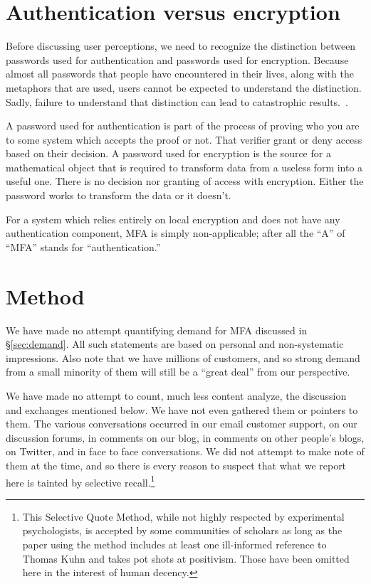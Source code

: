 \documentclass{soups}
\begin{document}
\section{Authentication versus encryption}

Before discussing user perceptions, we need to recognize the distinction between passwords used for authentication and passwords used for encryption.
Because almost all passwords that people have encountered in their lives,
along with the metaphors that are used, users cannot be expected to understand the distinction.
Sadly, failure to understand that distinction can lead to catastrophic results.~\autocite{Blaze2011:cablegate}.

A password used for authentication is part of the process of proving who you are to some system which accepts the proof or not. That verifier grant or deny access based on their decision. A password used for encryption is the source for a mathematical object that is required to transform data from a useless form into a useful one. There is no decision nor granting of access with encryption. Either the password works to transform the data or it doesn't.

For a system which relies entirely on local encryption and does not have any authentication component, MFA is simply non-applicable;
after all the “A” of “MFA” stands for “authentication.” 

\section{Method}

We have made no attempt quantifying demand for MFA discussed in \S\ref{sec:demand}.
All such statements are based on personal and non-systematic impressions.
Also note that we have millions of customers,
and so strong demand from a small minority of them will still be a “great deal” from our perspective.

We have made no attempt to count, much less content analyze, the discussion and exchanges mentioned below.
We have not even gathered them or pointers to them.
The various conversations occurred in our email customer support,
on our discussion forums,
in comments on our blog,
in comments on other people's blogs,
on Twitter,
and in face to face conversations. 
We did not attempt to make note of them at the time,
and so there is every reason to suspect that what we report here is tainted by selective recall.\footnote
  {This Selective Quote Method,
  while not highly respected by experimental psychologists,
  is accepted by some communities of scholars
  as long as the paper using the method includes
  at least one ill-informed reference to Thomas Kuhn
  and takes pot shots at positivism.
  Those have been omitted here in the interest of human decency.}
\end{document}
